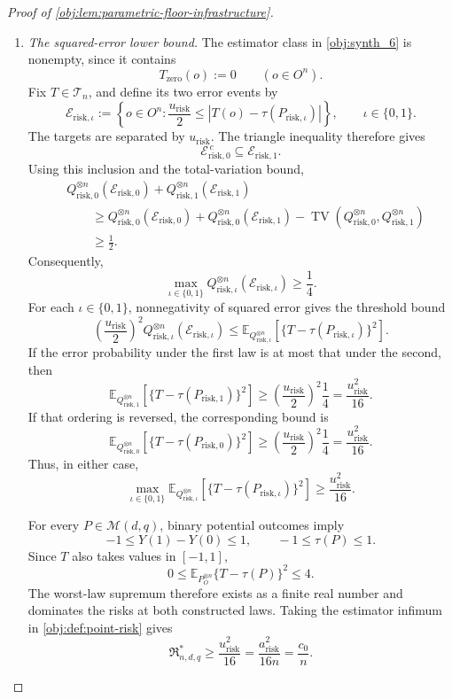 \documentclass[11pt]{article}
\begin{document}
\begin{proof}[Proof of \cref{obj:lem:parametric-floor-infrastructure}]
\begin{enumerate}
\item \emph{The squared-error lower bound.}
The estimator class in \cref{obj:synth_6} is nonempty, since it contains
\[
T_{\mathrm{zero}}(o):=0
\qquad(o\in O^n).
\]
Fix \(T\in\mathcal T_n\), and define its two error events by
\[
\mathcal E_{\mathrm{risk},\iota}
:=
\left\{
o\in O^n:
\frac{u_{\mathrm{risk}}}{2}
\le
\left|T(o)-\tau(P_{\mathrm{risk},\iota})\right|
\right\},
\qquad \iota\in\{0,1\}.
\]
The targets are separated by \(u_{\mathrm{risk}}\). The triangle inequality therefore gives
\[
\mathcal E_{\mathrm{risk},0}^{\,c}
\subseteq \mathcal E_{\mathrm{risk},1}.
\]
Using this inclusion and the total-variation bound,
\[
\begin{aligned}
&Q_{\mathrm{risk},0}^{\otimes n}(\mathcal E_{\mathrm{risk},0})
+
Q_{\mathrm{risk},1}^{\otimes n}(\mathcal E_{\mathrm{risk},1})\\
&\qquad\ge
Q_{\mathrm{risk},0}^{\otimes n}(\mathcal E_{\mathrm{risk},0})
+
Q_{\mathrm{risk},0}^{\otimes n}(\mathcal E_{\mathrm{risk},1})
-
\operatorname{TV}
 (Q_{\mathrm{risk},0}^{\otimes n},Q_{\mathrm{risk},1}^{\otimes n})\\
&\qquad\ge\frac12.
\end{aligned}
\]
Consequently,
\[
\max_{\iota\in\{0,1\}}
Q_{\mathrm{risk},\iota}^{\otimes n}(\mathcal E_{\mathrm{risk},\iota})
\ge\frac14.
\]
For each \(\iota\in\{0,1\}\), nonnegativity of squared error gives the threshold bound
\[
\left(\frac{u_{\mathrm{risk}}}{2}\right)^2
Q_{\mathrm{risk},\iota}^{\otimes n}(\mathcal E_{\mathrm{risk},\iota})
\le
\mathbb E_{Q_{\mathrm{risk},\iota}^{\otimes n}}
\left[
\{T-\tau(P_{\mathrm{risk},\iota})\}^2
\right].
\]
If the error probability under the first law is at most that under the second, then
\[
\mathbb E_{Q_{\mathrm{risk},1}^{\otimes n}}
\left[
\{T-\tau(P_{\mathrm{risk},1})\}^2
\right]
\ge
\left(\frac{u_{\mathrm{risk}}}{2}\right)^2\frac14
=
\frac{u_{\mathrm{risk}}^2}{16}.
\]
If that ordering is reversed, the corresponding bound is
\[
\mathbb E_{Q_{\mathrm{risk},0}^{\otimes n}}
\left[
\{T-\tau(P_{\mathrm{risk},0})\}^2
\right]
\ge
\left(\frac{u_{\mathrm{risk}}}{2}\right)^2\frac14
=
\frac{u_{\mathrm{risk}}^2}{16}.
\]
Thus, in either case,
\[
\max_{\iota\in\{0,1\}}
\mathbb E_{Q_{\mathrm{risk},\iota}^{\otimes n}}
\left[
\{T-\tau(P_{\mathrm{risk},\iota})\}^2
\right]
\ge\frac{u_{\mathrm{risk}}^2}{16}.
\]

For every \(P\in\mathcal M(d,q)\), binary potential outcomes imply
\[
-1\le Y(1)-Y(0)\le1,
\qquad
-1\le\tau(P)\le1.
\]
Since \(T\) also takes values in \([-1,1]\),
\[
0\le
\mathbb E_{P_O^{\otimes n}}\{T-\tau(P)\}^2
\le4.
\]
The worst-law supremum therefore exists as a finite real number and dominates the risks at both constructed laws. Taking the estimator infimum in \cref{obj:def:point-risk} gives
\[
\mathfrak R^*_{n,d,q}
\ge\frac{u_{\mathrm{risk}}^2}{16}
=
\frac{a_{\mathrm{risk}}^2}{16n}
=
\frac{c_0}{n}.
\]


\end{enumerate}
\end{proof}
\end{document}
